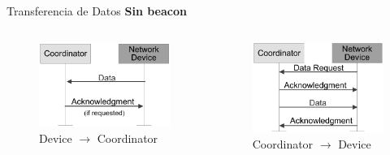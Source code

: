 \documentclass[aspectratio=169, handout]{beamer}
\begin{document}
\begin{frame}[t]{Transferencia de Datos}
\textbf{Sin beacon}
\begin{columns}[t]
	\begin{column}{.5\textwidth}
		\begin{minipage}[t][0.7\textheight][s]{\columnwidth}
			\begin{figure}[H]
				\includegraphics[height=.45\textheight]{./imagenes/dev-coord-sinbeacon.jpg}
				\vfill
				\vspace{10px}
				\caption{Device $\rightarrow$ Coordinator}
			\end{figure}
		\end{minipage}
	\end{column}
	\begin{column}{.5\textwidth}
		\begin{minipage}[t][0.7\textheight][s]{\columnwidth}
			\begin{figure}[H]
				\includegraphics[height=.5\textheight]{./imagenes/coord-dev-sinbeacon.jpg}
				\vfill
				\caption{Coordinator $\rightarrow$ Device}
			\end{figure}	 		
		\end{minipage}
	\end{column}
\end{columns} 	  	
\end{frame}
\end{document}
